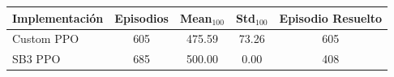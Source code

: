 \begin{tabular}{lcccc}
\toprule
Implementación & Episodios & Mean$_{100}$ & Std$_{100}$ & Episodio Resuelto \\
\midrule
Custom PPO & 605 & 475.59 & 73.26 & 605 \\
SB3 PPO & 685 & 500.00 & 0.00 & 408 \\
\bottomrule
\end{tabular}
